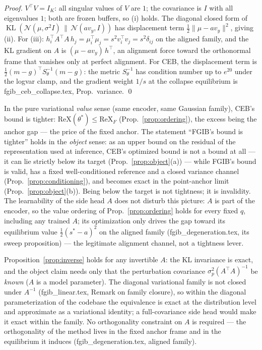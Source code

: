 \begin{proof}
$V^{\top}V = I_K$: all singular values of $V$ are $1$; the covariance is $I$ with all
eigenvalues $1$; both are frozen buffers, so (i) holds. The diagonal closed form of
$\operatorname{KL}(\mathcal{N}(\mu, \sigma^2 I)\,\|\,\mathcal{N}(a v_y, I))$ has
displacement term $\tfrac12\|\mu - a v_y\|^2$, giving (ii). For (iii):
$h_i^{\top} A^{\top} A\, h_j = \mu_i^{\top}\mu_j = s^2 v_i^{\top} v_j = s^2\delta_{ij}$
on the aligned family, and the KL gradient on $A$ is
$(\mu - a v_y)\,h^{\top}$, an alignment force toward the orthonormal frame that vanishes
only at perfect alignment. For CEB, the displacement term is
$\tfrac12(m - g)^{\top} S_\theta^{-1}(m - g)$: the metric $S_\theta^{-1}$ has condition
number up to $e^{20}$ under the logvar clamp, and the gradient weight $1/s$ at the
collapse equilibrium is fgib\_ceb\_collapse.tex, Prop.~variance. \hfill\qed
\end{proof}

\begin{remark}\label{rem:senses}
In the pure variational \emph{value} sense (same encoder, same Gaussian family), CEB's
bound is tighter: $\mathrm{ReX}(\theta^*) \le \mathrm{ReX}_F$
(Prop.~\ref{prop:ordering}), the excess being the anchor gap --- the price of the fixed
anchor. The statement ``FGIB's bound is tighter'' holds in the \emph{object} sense: as
an upper bound on the residual of the representation used at inference, CEB's optimized
bound is not a bound at all --- it can lie strictly below its target
(Prop.~\ref{prop:object}(a)) --- while FGIB's bound is valid, has a fixed
well-conditioned reference and a closed variance channel
(Prop.~\ref{prop:conditioning}), and becomes exact in the point-anchor limit
(Prop.~\ref{prop:object}(b)). Being below the target is not tightness; it is invalidity.
The learnability of the side head $A$ does not disturb this picture: $A$ is part of the
encoder, so the value ordering of Prop.~\ref{prop:ordering} holds for every fixed $q$,
including any trained $A$; its optimization only drives the gap toward its equilibrium
value $\tfrac12(s^*-a)^2$ on the aligned family (fgib\_degeneration.tex, its sweep
proposition) --- the legitimate alignment channel, not a tightness lever.
\end{remark}

\begin{remark}\label{rem:orth}
Proposition~\ref{prop:inverse} holds for any invertible $A$: the KL invariance is exact,
and the object claim needs only that the perturbation covariance
$\sigma_p^2(A^{\top}A)^{-1}$ be \emph{known} ($A$ is a model parameter). The diagonal
variational family is not closed under $A^{-1}$ (fgib\_linear.tex, Remark on family
closure), so within the diagonal parameterization of the codebase the equivalence is
exact at the distribution level and approximate as a variational identity; a
full-covariance side head would make it exact within the family. No orthogonality
constraint on $A$ is required --- the orthogonality of the method lives in the fixed
anchor frame and in the equilibrium it induces (fgib\_degeneration.tex, aligned family).
\end{remark}

